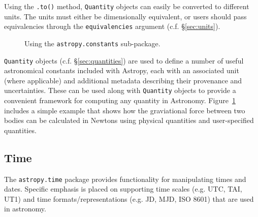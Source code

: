 \documentclass[traditabstract]{aa}
\begin{document}
Using the \texttt{.to()} method, \texttt{Quantity} objects can easily be
converted to different units. The units must either be dimensionally
equivalent, or users should pass equivalencies through the
\texttt{equivalencies} argument (c.f. \S\ref{sec:units}).

\begin{figure}
\center
\caption{Using the \texttt{astropy.constants} sub-package.\label{code:constants}}
\vspace{0.1in}
\end{figure}

\texttt{Quantity} objects (c.f. \S\ref{sec:quantities}) are used to
define a number of useful astronomical constants included with
Astropy, each with an associated unit (where applicable) and
additional metadata describing their provenance and
uncertainties. These can be used along with \texttt{Quantity} objects
to provide a convenient framework for computing any quantity in
Astronomy. Figure~\ref{code:constants} includes a simple example that
shows how the graviational force between two bodies can be calculated
in Newtons using physical quantities and user-specified quantities.

\subsection{Time}


The \texttt{astropy.time} package provides functionality for manipulating
times and dates.  Specific emphasis is placed on supporting time scales
(e.g. UTC, TAI, UT1) and time formats/representations (e.g. JD, MJD, ISO 8601) that
are used in astronomy.
\end{document}
